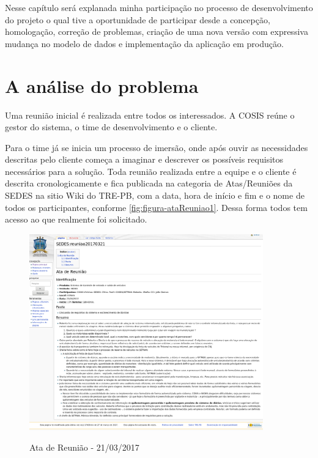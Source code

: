 Nesse capítulo será explanada minha participação no processo de desenvolvimento do projeto o qual tive a oportunidade de participar desde a concepção, homologação, correção de problemas, criação de uma nova versão com expressiva mudança no modelo de dados e implementação da aplicação em produção. 

\section{A análise do problema}
\label{sec:atividadesRealizadasInicio}

Uma reunião inicial é realizada entre todos os interessados. A COSIS reúne o gestor do sistema, o time de desenvolvimento e o cliente. 

Para o time já se inicia um processo de imersão, onde após ouvir as necessidades descritas pelo cliente começa a imaginar e descrever os possíveis requisitos necessários para a solução. 
Toda reunião realizada entre a equipe e o cliente é descrita cronologicamente e fica publicada na categoria de Atas/Reuniões da SEDES na sitio Wiki do TRE-PB, com a data, hora de início e fim e o nome de todos os participantes, conforme \autoref{fig:figura-ataReuniao1}. Dessa forma todos tem acesso ao que realmente foi solicitado.

\begin{figure}[!htb]
    \centering
    \caption{Ata de Reunião - 21/03/2017}
    \includegraphics[width=0.9\textwidth]{dados/figuras/veiculos-reuniao20170321}
    \label{fig:figura-ataReuniao1}
\end{figure}

